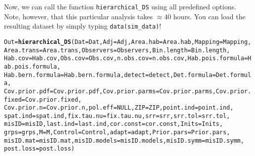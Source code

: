 \documentclass{article}\usepackage{graphicx, color}
\makeatletter
\newcommand{\hlfunctioncall}[1]{\textcolor[rgb]{0.501960784313725,0,0.329411764705882}{\textbf{#1}}}%
\newenvironment{kframe}{%
 \def\at@end@of@kframe{}%
 \ifinner\ifhmode%
  \def\at@end@of@kframe{\end{minipage}}%
  \begin{minipage}{\columnwidth}%
 \fi\fi%
 \def\FrameCommand##1{\hskip\@totalleftmargin \hskip-\fboxsep
 \colorbox{shadecolor}{##1}\hskip-\fboxsep
     \hskip-\linewidth \hskip-\@totalleftmargin \hskip\columnwidth}%
 \MakeFramed {\advance\hsize-\width
   \@totalleftmargin\z@ \linewidth\hsize
   \@setminipage}}%
 {\par\unskip\endMakeFramed%
 \at@end@of@kframe}
\newenvironment{knitrout}{}{} %
\makeatother
\begin{document}
Now, we can call the function \texttt{hierarchical\_DS} using all predefined options.  Note, however, that this particular analysis takes $\approx 40$ hours.  You can load the resulting dataset by simply typing \texttt{data(sim\_data)}!
\begin{knitrout}
\color{fgcolor}\begin{kframe}
\begin{alltt}
Out = \hlfunctioncall{hierarchical_DS}(Dat = Dat, Adj = Adj, Area.hab = Area.hab, Mapping = Mapping, 
    Area.trans = Area.trans, Observers = Observers, Bin.length = Bin.length, 
    Hab.cov = Hab.cov, Obs.cov = Obs.cov, n.obs.cov = n.obs.cov, Hab.pois.formula = Hab.pois.formula, 
    Hab.bern.formula = Hab.bern.formula, detect = detect, Det.formula = Det.formula, 
    Cov.prior.pdf = Cov.prior.pdf, Cov.prior.parms = Cov.prior.parms, Cov.prior.fixed = Cov.prior.fixed, 
    Cov.prior.n = Cov.prior.n, pol.eff = NULL, ZIP = ZIP, point.ind = point.ind, 
    spat.ind = spat.ind, fix.tau.nu = fix.tau.nu, srr = srr, srr.tol = srr.tol, 
    misID = misID, last.ind = last.ind, cor.const = cor.const, Inits = Inits, 
    grps = grps, M = M, Control = Control, adapt = adapt, Prior.pars = Prior.pars, 
    misID.mat = misID.mat, misID.models = misID.models, misID.symm = misID.symm, 
    post.loss = post.loss)
\end{alltt}


{\ttfamily\noindent\itshape\color{messagecolor}{\#\# Loading required package: Matrix}}

{\ttfamily\noindent\itshape\color{messagecolor}{\#\# Loading required package: lattice}}

{\ttfamily\noindent\itshape\color{messagecolor}{\#\# Loading required package: truncnorm}}

{\ttfamily\noindent\itshape\color{messagecolor}{\#\# Loading required package: mc2d}}

{\ttfamily\noindent\itshape\color{messagecolor}{\#\# \\\#\# Welcome in mc2d. Please check new updates regularly and/or\\\#\# register to the mailing list:\\\#\# see http://lists.r-forge.r-project.org/mailman/listinfo/riskassessment-news}}

{\ttfamily\noindent\itshape\color{messagecolor}{\#\# \\\#\# Attaching package: 'mc2d'}}

{\ttfamily\noindent\itshape\color{messagecolor}{\#\# The following object is masked from 'package:base':\\\#\# \\\#\#\ \ \ \  pmax, pmin}}


\end{kframe}
\end{knitrout}
\end{document}
